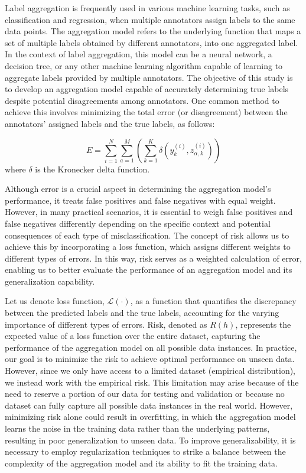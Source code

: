 Label aggregation is frequently used in various machine learning tasks, such as classification and regression, when multiple annotators assign labels to the same data points. The aggregation model refers to the underlying function that maps a set of multiple labels obtained by different annotators, into one aggregated label. In the context of label aggregation, this model can be a neural network, a decision tree, or any other machine learning algorithm capable of learning to aggregate labels provided by multiple annotators. The objective of this study is to develop an aggregation model capable of accurately determining true labels despite potential disagreements among annotators. One common method to achieve this involves minimizing the total error (or disagreement) between the annotators' assigned labels and the true labels, as follows:


\begin{equation}
E = \sum_{i=1}^N \sum_{a=1}^M \left( \sum_{k=1}^K \delta\left(y_k^{(i)}, z_{\alpha,k}^{(i)}\right) \right)
\label{eq:crowd.eq.1.risk.error}
\end{equation}
where $\delta $ is the Kronecker delta function.

Although error is a crucial aspect in determining the aggregation model's performance, it treats false positives and false negatives with equal weight. However, in many practical scenarios, it is essential to weigh false positives and false negatives differently depending on the specific context and potential consequences of each type of misclassification. The concept of risk allows us to achieve this by incorporating a loss function, which assigns different weights to different types of errors. In this way, risk serves as a weighted calculation of error, enabling us to better evaluate the performance of an aggregation model and its generalization capability.

Let us denote loss function, $\mathcal{L}(\cdot)$, as a function that quantifies the discrepancy between the predicted labels and the true labels, accounting for the varying importance of different types of errors.
Risk, denoted as $R(h) $, represents the expected value of a loss  function over the entire dataset, capturing the performance of the aggregation model on all possible data instances.  In practice, our goal is to minimize the risk to achieve optimal performance on unseen data. However, since we only have access to a limited dataset (empirical distribution), we instead work with the empirical risk. This limitation may arise because of the need to reserve a portion of our data for testing and validation or because no dataset can fully capture all possible data instances in the real world. However, minimizing risk alone could result in overfitting, in which the aggregation model learns the noise in the training data rather than the underlying patterns, resulting in poor generalization to unseen data. To improve generalizability, it is necessary to employ regularization techniques to strike a balance between the complexity of the aggregation model and its ability to fit the training data.

